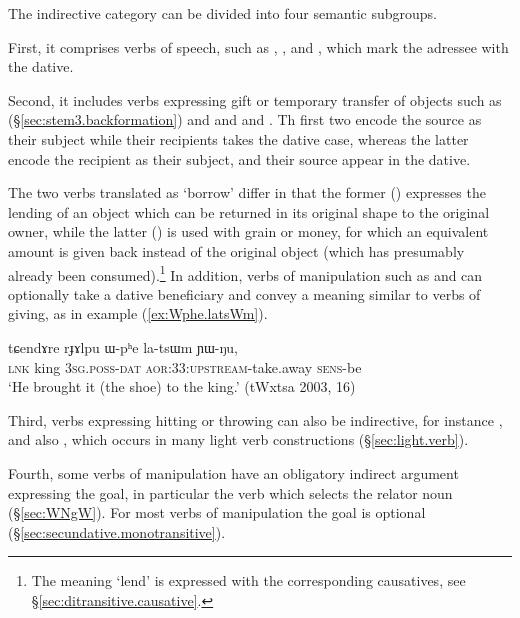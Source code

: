 The indirective category can be divided into four semantic subgroups. 

First, it comprises verbs of speech, such as , ,   and , which mark the adressee with the dative.

Second, it includes verbs expressing gift or temporary transfer of objects such as  (§\ref{sec:stem3.backformation}) and  and   and . Th first two encode the source as their subject while their recipients takes the dative case, whereas the latter encode the recipient as their subject, and their source appear in the dative. 

The two verbs translated as `borrow' differ in that the former () expresses the lending of an object which can be returned in its original shape to the original owner, while the latter () is used with grain or money, for which an equivalent amount is given back instead of the original object (which has presumably already been consumed).\footnote{The meaning `lend' is expressed with the corresponding causatives, see §\ref{sec:ditransitive.causative}.} In addition, verbs of manipulation such as  and  can optionally take a dative beneficiary and convey a meaning similar to verbs of giving, as in example (\ref{ex:Wphe.latsWm}).

\begin{exe}
	\ex \label{ex:Wphe.latsWm}
	\gll  tɕendɤre rɟɤlpu ɯ-pʰe la-tsɯm ɲɯ-ŋu,  \\
	\textsc{lnk}  king \textsc{3sg}.\textsc{poss}-\textsc{dat} \textsc{aor}:3\fl{}3:\textsc{upstream}-take.away \textsc{sens}-be \\
	\glt `He brought it (the shoe) to the king.'  (tWxtsa 2003, 16)
\end{exe}

Third, verbs expressing hitting or throwing can also be indirective, for instance , and also , which occurs in many light verb constructions (§\ref{sec:light.verb}).

Fourth, some verbs of manipulation have an obligatory indirect argument expressing the goal, in particular the verb  which selects the relator noun  (§\ref{sec:WNgW}). For most verbs of manipulation the goal is optional  (§\ref{sec:secundative.monotransitive}).

